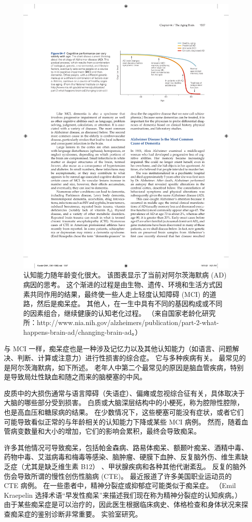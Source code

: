 \begin{figure}[htbp]
	\centering
	\includegraphics[width=0.6\linewidth]{chap64/fig_64_7}
	\caption{认知能力随年龄变化很大。 该图表显示了当前对阿尔茨海默病 (AD) 病因的思考。 这个渐进的过程是由生物、遗传、环境和生活方式因素共同作用的结果，最终使一些人走上轻度认知障碍 (MCI) 的道路，然后是痴呆症。 其他人，在一生中具有不同的基因构成或不同的因素组合，继续健康的认知老化过程。 （来自国家老龄化研究所：http://www.nia.nih.gov/alzheimers/publication/part-2-what-happens-brain-ad/changing-brain-ad。）}
	\label{fig:64_7}
\end{figure}


与 MCI 一样，痴呆症也是一种涉及记忆力以及其他认知能力（如语言、问题解决、判断、计算或注意力）进行性损害的综合症。
它与多种疾病有关。 最常见的是阿尔茨海默病，如下所述。
老年人中第二个最常见的原因是脑血管疾病，特别是导致局灶性缺血和随之而来的脑梗塞的中风。


皮质中的大损伤通常与语言障碍（失语症）、偏瘫或忽视综合征有关，具体取决于大脑的哪些部分受到损害。
白质或大脑深层结构中的小梗死，称为腔隙性腔隙，也是高血压和糖尿病的结果。
在少数情况下，这些梗塞可能没有症状，或者它们可能导致看似正常的与年龄相关的认知能力下降或某些 MCI 病例。
然而，随着血管病变数量和大小的增加，它们的影响会累积，最终会导致痴呆。


许多其他情况可导致痴呆，包括帕金森病、路易体痴呆、额颞叶痴呆、酒精中毒、药物中毒、艾滋病毒和梅毒等感染、脑肿瘤、硬膜下血肿、反复脑外伤、维生素缺乏症（尤其是缺乏维生素 B12） 、甲状腺疾病和各种其他代谢紊乱。
反复的脑外伤会导致所谓的慢性创伤性脑病 (CTE)。
最近报道了许多美国职业运动员的 CTE 病例。 在一些患者中，精神分裂症或抑郁症可能类似于痴呆症。
（Emil Kraepelin 选择术语“早发性痴呆”来描述我们现在称为精神分裂症的认知疾病。）由于某些痴呆症是可以治疗的，因此医生根据临床病史、体格检查和身体状况来探查痴呆症的鉴别诊断非常重要。 实验室研究。




